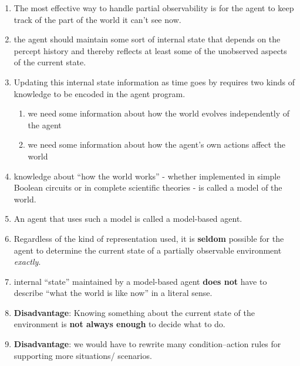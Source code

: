 \begin{enumerate}
    \item The most effective way to handle partial observability is for the agent to keep track of the part of the world it can’t see now.
    \hfill \cite{ai/book/Artificial-Intelligence-A-Modern-Approach/Russell-Norvig}

    \item the agent should maintain some sort of internal state that depends on the percept history and thereby reflects at least some of the unobserved aspects of the current state. 
    \hfill \cite{ai/book/Artificial-Intelligence-A-Modern-Approach/Russell-Norvig}

    \item Updating this internal state information as time goes by requires two kinds of knowledge to be encoded in the agent program.
    \begin{enumerate}
        \item we need some information about how the world evolves independently of the agent
        \hfill \cite{ai/book/Artificial-Intelligence-A-Modern-Approach/Russell-Norvig}

        \item we need some information about how the agent’s own actions affect the world
        \hfill \cite{ai/book/Artificial-Intelligence-A-Modern-Approach/Russell-Norvig}
    \end{enumerate}

    \item knowledge about “how the world works” - whether implemented in simple Boolean circuits or in complete scientific theories - is called a model of the world. 
    \hfill \cite{ai/book/Artificial-Intelligence-A-Modern-Approach/Russell-Norvig}

    \item An agent that uses such a model is called a model-based agent.
    \hfill \cite{ai/book/Artificial-Intelligence-A-Modern-Approach/Russell-Norvig}

    \item Regardless of the kind of representation used, it is \textbf{seldom} possible for the agent to determine the current state of a partially observable environment \textit{exactly}.
    \hfill \cite{ai/book/Artificial-Intelligence-A-Modern-Approach/Russell-Norvig}

    \item internal “state” maintained by a model-based agent \textbf{does not} have to describe “what the world is like now” in a literal sense.
    \hfill \cite{ai/book/Artificial-Intelligence-A-Modern-Approach/Russell-Norvig}

    \item \textbf{Disadvantage}: Knowing something about the current state of the environment is \textbf{not always enough} to decide what to do.
    \hfill \cite{ai/book/Artificial-Intelligence-A-Modern-Approach/Russell-Norvig}

    \item \textbf{Disadvantage}: we would have to rewrite many condition–action rules for supporting more situations/ scenarios.     
\end{enumerate}


